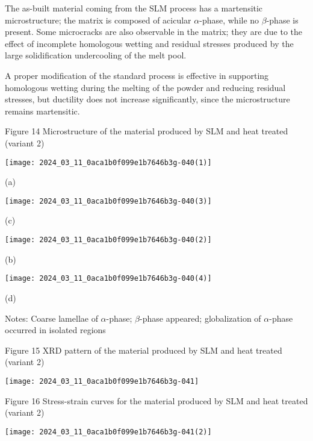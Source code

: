 \documentclass[10pt]{article}
\begin{document}
The as-built material coming from the SLM process has a martensitic microstructure; the matrix is composed of acicular $\alpha$-phase, while no $\beta$-phase is present. Some microcracks are also observable in the matrix; they are due to the effect of incomplete homologous wetting and residual stresses produced by the large solidification undercooling of the melt pool.

A proper modification of the standard process is effective in supporting homologous wetting during the melting of the powder and reducing residual stresses, but ductility does not increase significantly, since the microstructure remains martensitic.

Figure 14 Microstructure of the material produced by SLM and heat treated (variant 2)

\begin{center}
\texttt{[image: 2024\_03\_11\_0aca1b0f099e1b7646b3g-040(1)]}
\end{center}

(a)

\begin{center}
\texttt{[image: 2024\_03\_11\_0aca1b0f099e1b7646b3g-040(3)]}
\end{center}

(c)

\begin{center}
\texttt{[image: 2024\_03\_11\_0aca1b0f099e1b7646b3g-040(2)]}
\end{center}

(b)

\begin{center}
\texttt{[image: 2024\_03\_11\_0aca1b0f099e1b7646b3g-040(4)]}
\end{center}

(d)

Notes: Coarse lamellae of $\alpha$-phase; $\beta$-phase appeared; globalization of $\alpha$-phase occurred in isolated regions

Figure 15 XRD pattern of the material produced by SLM and heat treated (variant 2)

\begin{center}
\texttt{[image: 2024\_03\_11\_0aca1b0f099e1b7646b3g-041]}
\end{center}

Figure 16 Stress-strain curves for the material produced by SLM and heat treated (variant 2)

\begin{center}
\texttt{[image: 2024\_03\_11\_0aca1b0f099e1b7646b3g-041(2)]}
\end{center}
\end{document}
